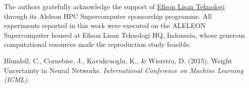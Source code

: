\documentclass{article}
\begin{document}
The authors gratefully acknowledge the support of \href{https://efisonlt.com}{Efison Lisan Teknologi} through its Aleleon HPC Supercomputer sponsorship programme.  All experiments reported in this work were executed on the ALELEON Supercomputer housed at Efison Lisan Teknologi HQ, Indonesia, whose generous computational resources made the reproduction study feasible.

\begin{thebibliography}{9}
Blundell, C., Cornebise, J., Kavukcuoglu, K., \& Wierstra, D. (2015). Weight Uncertainty in Neural Networks. \textit{International Conference on Machine Learning (ICML)}.
\end{thebibliography}
\end{document}
